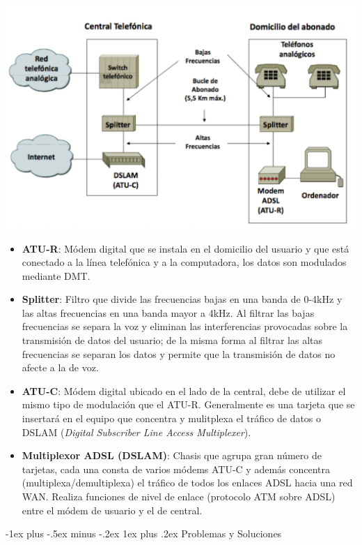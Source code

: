 \documentclass[10pt,portrait, twocolumn]{article}
\makeatletter
\renewcommand{\subsubsection}{\@startsection{subsubsection}{3}{0mm}%
                                {-1ex plus -.5ex minus -.2ex}%
                                {1ex plus .2ex}%
                                {\normalfont\small\bfseries}}
\makeatother
\begin{document}
	\begin{center}
		\includegraphics[scale=0.3]{images/ADSL}
	\end{center}
	
	\begin{itemize}
		\item \textbf{ATU-R}: Módem digital que se instala en el domicilio del usuario y que está conectado a la línea telefónica y a la computadora, los datos son modulados mediante DMT.
		\item \textbf{Splitter}: Filtro que divide las frecuencias bajas en una banda de 0-4kHz y las altas frecuencias en una banda mayor a 4kHz. Al filtrar las bajas frecuencias se separa la voz y eliminan las interferencias provocadas sobre la transmisión de datos del usuario; de la misma forma al filtrar las altas frecuencias se separan los datos y permite que la transmisión de datos no afecte a la de voz.
		\item \textbf{ATU-C}: Módem digital ubicado en el lado de la central, debe de utilizar el mismo tipo de modulación que el ATU-R. Generalmente es una tarjeta que se insertará en el equipo que concentra y mulitplexa el tráfico de datos o DSLAM (\textit{Digital Subscriber Line Access Multiplexer}).
		\item \textbf{Multiplexor ADSL (DSLAM)}: Chasis que agrupa gran número de tarjetas, cada una consta de varios módems ATU-C y además concentra (multiplexa/demultiplexa) el tráfico de todos los enlaces ADSL hacia una red WAN. Realiza funciones de nivel de enlace (protocolo ATM sobre ADSL) entre el módem de usuario y el de central.
	\end{itemize}
	
\subsubsection{Problemas y Soluciones}
\end{document}
